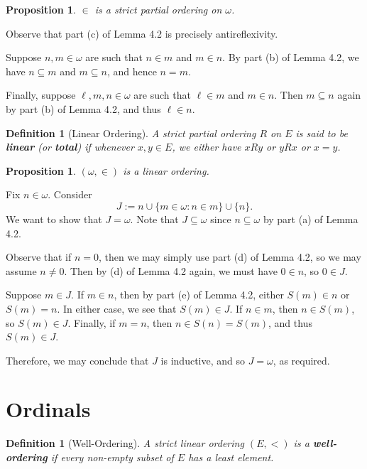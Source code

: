 \documentclass[10pt]{article}
\makeatletter
\theoremstyle{newstyle}
\newtheorem{prop}[thm]{Proposition}
\newtheorem{defn}[thm]{Definition}
\newenvironment{pf}[1][\proofname]{\par
  \pushQED{\qed}%
  \normalfont \topsep0\p@\relax
  \trivlist
  \item[\hskip\labelsep\scshape
  #1\@addpunct{.}]\ignorespaces
}{%
  \popQED\endtrivlist\@endpefalse
}
\makeatother
\begin{document}
\begin{prop} 
$\in$ is a strict partial ordering on $\omega$. 
\end{prop}
\begin{pf}
Observe that part (c) of Lemma 4.2 is precisely antireflexivity. 

Suppose $n, m \in \omega$ are such that $n \in m$ and $m \in n$. By part (b) of Lemma 4.2, 
we have $n \subseteq m$ and $m \subseteq n$, and hence $n = m$. 

Finally, suppose $\ell, m, n \in \omega$ are such that $\ell \in m$ and $m \in n$. 
Then $m \subseteq n$ again by part (b) of Lemma 4.2, and thus 
$\ell \in n$.
\end{pf}

\begin{defn}[Linear Ordering] 
A strict partial ordering $R$ on $E$ is said to be {\bf linear} (or {\bf total}) if whenever 
$x, y \in E$, we either have $xRy$ or $yRx$ or $x = y$. 
\end{defn} 

\begin{prop}
$(\omega, \in)$ is a linear ordering.
\end{prop}
\begin{pf}
Fix $n \in \omega$. Consider 
\[ J := n \cup \{m \in \omega : n \in m\} \cup \{n\}. \] 
We want to show that $J = \omega$. Note that $J \subseteq \omega$ since $n \subseteq \omega$ by 
part (a) of Lemma 4.2. 

Observe that if $n = 0$, then we may simply use part (d) of Lemma 4.2, 
so we may assume $n \neq 0$. Then by (d) of Lemma 4.2 again, we must have $0 \in n$, so $0 \in J$. 

Suppose $m \in J$. If $m \in n$, then by part (e) of Lemma 4.2, either $S(m) \in n$ or $S(m) = n$. 
In either case, we see that $S(m) \in J$. If $n \in m$, then $n \in S(m)$, so $S(m) \in J$. 
Finally, if $m = n$, then $n \in S(n) = S(m)$, and thus $S(m) \in J$. 

Therefore, we may conclude that $J$ is inductive, and so $J = \omega$, as required.
\end{pf}

%  
\newpage\section{Ordinals} 

\begin{defn}[Well-Ordering] 
A strict linear ordering $(E, <)$ is a {\bf well-ordering} if every non-empty subset of $E$ has a 
least element.
\end{defn}
\end{document}
